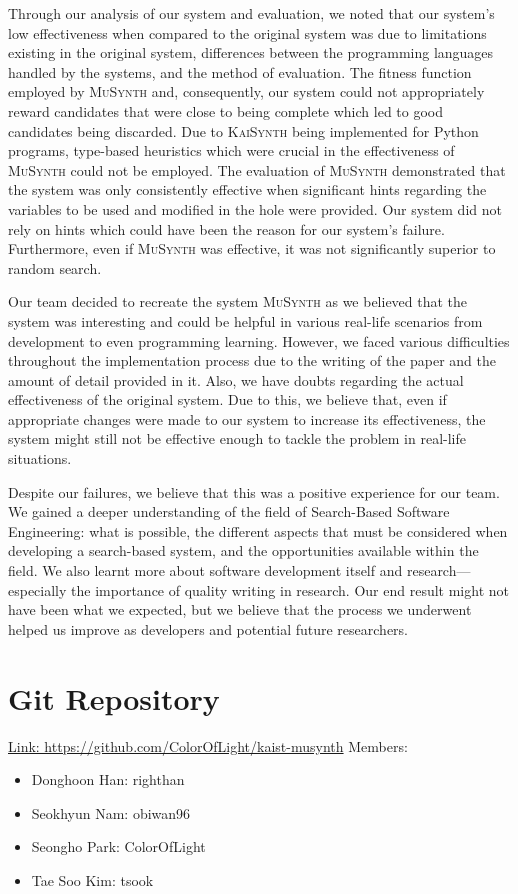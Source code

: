 \documentclass{article}
\begin{document}
Through our analysis of our system and evaluation, we noted that our system's low effectiveness when compared to the original system was due to limitations existing in the original system, differences between the programming languages handled by the systems, and the method of evaluation. The fitness function employed by \textsc{MuSynth} and, consequently, our system could not appropriately reward candidates that were close to being complete which led to good candidates being discarded. Due to \textsc{KaiSynth} being implemented for Python programs, type-based heuristics which were crucial in the effectiveness of \textsc{MuSynth} could not be employed. The evaluation of \textsc{MuSynth} demonstrated that the system was only consistently effective when significant hints regarding the variables to be used and modified in the hole were provided. Our system did not rely on hints which could have been the reason for our system's failure. Furthermore, even if \textsc{MuSynth} was effective, it was not significantly superior to random search.

Our team decided to recreate the system \textsc{MuSynth} as we believed that the system was interesting and could be helpful in various real-life scenarios from development to even programming learning. However, we faced various difficulties throughout the implementation process due to the writing of the paper and the amount of detail provided in it. Also, we have doubts regarding the actual effectiveness of the original system. Due to this, we believe that, even if appropriate changes were made to our system to increase its effectiveness, the system might still not be effective enough to tackle the problem in real-life situations. 

Despite our failures, we believe that this was a positive experience for our team. We gained a deeper understanding of the field of Search-Based Software Engineering: what is possible, the different aspects that must be considered when developing a search-based system, and the opportunities available within the field. We also learnt more about software development itself and research---especially the importance of quality writing in research. Our end result might not have been what we expected, but we believe that the process we underwent helped us improve as developers and potential future researchers. 
 
\section{Git Repository}
\href{https://github.com/ColorOfLight/kaist-musynth}{Link: https://github.com/ColorOfLight/kaist-musynth} \newline Members:
\begin{itemize}
    \item Donghoon Han: righthan
    \item Seokhyun Nam: obiwan96
    \item Seongho Park: ColorOfLight
    \item Tae Soo Kim: tsook
\end{itemize}

\printbibliography
\end{document}

